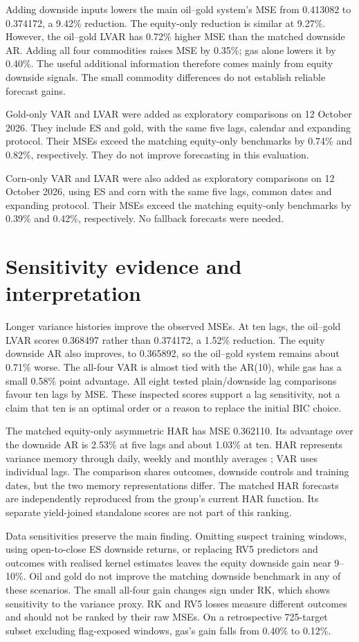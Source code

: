 \documentclass[11pt,letterpaper]{article}
\begin{document}
Adding downside inputs lowers the main oil--gold system's MSE from 0.413082 to
0.374172, a 9.42\% reduction. The equity-only reduction is similar at 9.27\%.
However, the oil--gold LVAR has 0.72\% higher MSE than the matched downside
AR. Adding all four commodities raises MSE by 0.35\%; gas alone lowers it by 0.40\%.
The useful additional information therefore comes mainly from equity downside
signals. The small commodity differences do not establish reliable forecast gains.

Gold-only VAR and LVAR were added as exploratory comparisons on 12 October 2026.
They include ES and gold, with the same five lags, calendar and expanding protocol.
Their MSEs exceed the matching equity-only benchmarks by 0.74\%
and 0.82\%, respectively. They do not improve forecasting in this evaluation.

Corn-only VAR and LVAR were also added as exploratory comparisons on 12 October
2026, using ES and corn with the same five lags, common dates and expanding protocol.
Their MSEs exceed the matching equity-only benchmarks by 0.39\%
and 0.42\%, respectively. No fallback forecasts were needed.

\clearpage
\section*{Sensitivity evidence and interpretation}
Longer variance histories improve the observed MSEs. At ten lags, the oil--gold
LVAR scores 0.368497 rather than 0.374172, a 1.52\% reduction. The equity
downside AR also improves, to 0.365892, so the oil--gold system remains about 0.71\%
worse. The all-four VAR is almost tied with the AR(10), while gas has a small
0.58\% point advantage. All eight tested plain/downside lag comparisons favour
ten lags by MSE. These inspected scores support a lag sensitivity, not a claim
that ten is an optimal order or a reason to replace the initial BIC choice.

The matched equity-only asymmetric HAR has MSE 0.362110. Its advantage over the
downside AR is 2.53\% at five lags and about 1.03\% at ten. HAR represents variance
memory through daily, weekly and monthly averages \cite{corsi}; VAR uses individual
lags. The comparison shares outcomes, downside controls and training dates, but
the two memory representations differ. The matched HAR forecasts are independently
reproduced from the group's current HAR function. Its separate yield-joined
standalone scores are not part of this ranking.

Data sensitivities preserve the main finding. Omitting suspect training windows,
using open-to-close ES downside returns, or replacing RV5 predictors and outcomes
with realised kernel estimates leaves the equity downside gain near 9--10\%.
Oil and gold do not improve the matching downside benchmark in any of these
scenarios. The small all-four gain changes sign under RK, which shows sensitivity
to the variance proxy. RK and RV5 losses measure different outcomes and should
not be ranked by their raw MSEs. On a retrospective 725-target subset excluding
flag-exposed windows, gas's gain falls from 0.40\% to 0.12\%.
\end{document}
